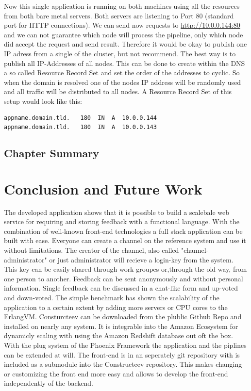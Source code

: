 {Now this single application is running on both machines using all the resources from both bare metal servers. Both servers are listening to Port 80 (standard port for HTTP connections). We can send now requests to \url{http://10.0.0.144:80} and we can not guarantee which node will process the pipeline, only which node did accept the request and send result. Therefore it would be okay to publish one IP adress from a single of the cluster, but not recommend.
The best way is to publish all IP-Addresses of all nodes. This can be done to create within the DNS a so called Resource Record Set and set the order of the addresses to cyclic. So when the domain is resolved  one of the nodes IP address will be randomly used and all traffic will be distributed to all nodes. A Resource Record Set of this setup would look like this:
\begin{lstlisting}[caption={Resource Record Set},label=lst:nodecondig]
appname.domain.tld.   180  IN  A  10.0.0.144
appname.domain.tld.   180  IN  A  10.0.0.143
\end{lstlisting}

}

\section{Chapter Summary}

\chapter{Conclusion and Future Work}
The developed application shows that it is possible to build a scalebale web service for requiring and storing feedback with a functional language. With the combination of well-known front-end technologies a full stack application can be built with ease. 
Everyone can create a channel on the reference system and use it without limitations. 
The creator of the channel, also called "channel-administrator" or just administrator will recieve a login-key from the system. This key can be easily shared through work groupes or,through the old way, from one person to another. 
Feedback can be sent anonymously and without personal information. Single feedback can be discussed in a chat-like form and up-voted and down-voted. 
The simple benchmark has shown the scalability of the application to a certain extent by adding more servers or CPU cores to the ErlangVM.
\textcolor{newcode}{Consturcteev can be downloaded from the plublic Github Repo and installed on nearly any system. It is integrable into the Amazon Ecosystem for dynamicly scaling with using the Amazon Redshift database out oft the box.
With the plug system of the Phoenix Framework the application and the piplines can be extended at will. The front-end is in an seperately git repository with is included as a submodule into the Constructeev repository. This makes changing or customizing the front end more easy and allows to develop the front-end independently of the backend.}

